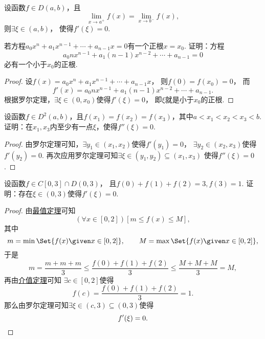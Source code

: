\begin{corollary}
设函数\(f \in D(a,b)\)，且\[
	\lim_{x \to a^+} f(x)
	= \lim_{x \to b^-} f(x),
\]
则\(\exists\xi\in(a,b)\)，
使得\(f'(\xi) = 0\).
\end{corollary}

\begin{example}\label{example:微分中值定理.一元高次方程的根的存在性}
若方程\(a_0 x^n + a_1 x^{n-1} + \dotsb + a_{n-1} x = 0\)有一个正根\(x = x_0\).
证明：方程\[
	a_0 n x^{n-1} + a_1 (n-1) x^{n-2} + \dotsb + a_{n-1} = 0
\]必有一个小于\(x_0\)的正根.
\begin{proof}
设\(f(x) = a_0 x^n + a_1 x^{n-1} + \dotsb + a_{n-1} x\)，
则\(f(0) = f(x_0) = 0\)，
而\[
	f'(x) = a_0 n x^{n-1} + a_1 (n-1) x^{n-2} + \dotsb + a_{n-1}.
\]
根据罗尔定理，\(\exists \xi \in (0,x_0)\)使得\(f'(\xi) = 0\)，
即\(\xi\)就是小于\(x_0\)的正根.
\end{proof}
\end{example}
\begin{example}
设函数\(f \in D^2(a,b)\)，且\(f(x_1) = f(x_2) = f(x_3)\)，其中\(a < x_1 < x_2 < x_3 < b\).
证明：在\(x_1,x_3\)内至少有一点\(\xi\)，使得\(f''(\xi) = 0\).
\begin{proof}
由罗尔定理可知，\(\exists y_1\in(x_1,x_2)\)使得\(f'(y_1) = 0\)，
\(\exists y_2\in(x_2,x_3)\)使得\(f'(y_2) = 0\).
再次应用罗尔定理可知\(\exists \xi\in(y_1,y_2)\subseteq(x_1,x_3)\)
使得\(f''(\xi) = 0\).
\end{proof}
\end{example}

\begin{example}
设函数\(f \in C[0,3] \cap D(0,3)\)，
且\(f(0) + f(1) + f(2) = 3,
f(3) = 1\).
证明：存在\(\xi\in(0,3)\)使得\(f'(\xi) = 0\).
\begin{proof}
由\hyperref[theorem:极限.最值定理]{最值定理}可知\[
	(\forall x\in[0,2])
	[m \leq f(x) \leq M],
\]
其中\[
	m = \min\Set{ f(x) \given x\in[0,2] },
	\qquad
	M = \max\Set{ f(x) \given x\in[0,2] },
\]
于是\[
	m = \frac{m+m+m}3 \leq \frac{f(0) + f(1) + f(2)}3 \leq \frac{M+M+M}3 = M,
\]
再由\hyperref[theorem:极限.闭区间上连续函数的性质.介值定理2]{介值定理}可知
\(\exists c\in[0,2]\)使得\[
	f(c) = \frac{f(0) + f(1) + f(2)}3 = 1.
\]
那么由罗尔定理可知\(\exists\xi\in(c,3)\subseteq(0,3)\)使得\[
	f'(\xi) = 0.
	\qedhere
\]
\end{proof}
\end{example}

